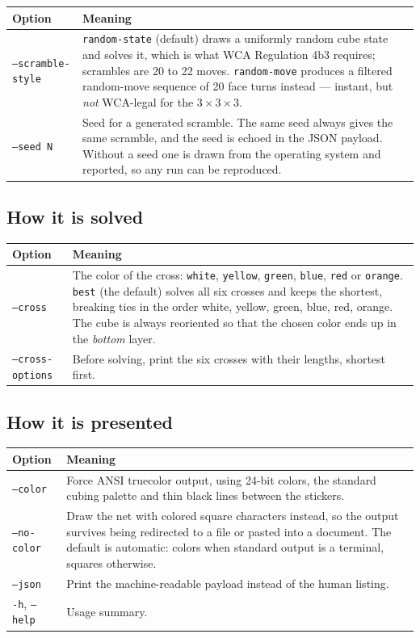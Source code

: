 \begin{longtable}{@{}p{3.2cm}p{11.2cm}@{}}
\toprule
Option & Meaning \\
\midrule
\endhead
\texttt{--scramble-style} &
\texttt{random-state} (default) draws a uniformly random cube state and solves it,
which is what WCA Regulation 4b3 requires; scrambles are 20 to 22 moves.
\texttt{random-move} produces a filtered random-move sequence of 20 face turns
instead --- instant, but \emph{not} WCA-legal for the $3\times3\times3$. \\
\texttt{--seed N} &
Seed for a generated scramble.  The same seed always gives the same scramble, and
the seed is echoed in the JSON payload.  Without a seed one is drawn from the
operating system and reported, so any run can be reproduced. \\
\bottomrule
\end{longtable}

\subsection{How it is solved}

\begin{longtable}{@{}p{3.2cm}p{11.2cm}@{}}
\toprule
Option & Meaning \\
\midrule
\endhead
\texttt{--cross} &
The color of the cross: \texttt{white}, \texttt{yellow}, \texttt{green},
\texttt{blue}, \texttt{red} or \texttt{orange}.  \texttt{best} (the default) solves
all six crosses and keeps the shortest, breaking ties in the order white, yellow,
green, blue, red, orange.  The cube is always reoriented so that the chosen color
ends up in the \emph{bottom} layer. \\
\texttt{--cross-options} &
Before solving, print the six crosses with their lengths, shortest first. \\
\bottomrule
\end{longtable}

\subsection{How it is presented}

\begin{longtable}{@{}p{3.2cm}p{11.2cm}@{}}
\toprule
Option & Meaning \\
\midrule
\endhead
\texttt{--color} &
Force ANSI truecolor output, using 24-bit colors, the standard
cubing palette and thin black lines between the stickers. \\
\texttt{--no-color} &
Draw the net with colored square characters instead, so the output survives being
redirected to a file or pasted into a document.  The default is automatic: colors
when standard output is a terminal, squares otherwise. \\
\texttt{--json} &
Print the machine-readable payload instead of the human listing. \\
\texttt{-h}, \texttt{--help} &
Usage summary. \\
\bottomrule
\end{longtable}


